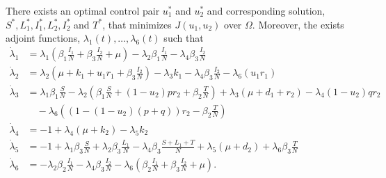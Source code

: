 \begin{theorem}
    There exists an optimal control pair $u_{1}^{*}$ and $u_{2}^{*}$ and 
    corresponding solution, $S^{*}, L_{1}^{*}, I_{1}^{*}, L_{2}^{*}, I_{2}^{*}$
    and $T^{*}$, that minimizes $J(u_1,u_2)$ over $\Omega$. Moreover, the exists
    adjoint functions, $\lambda_{1}(t), \ldots, \lambda_{6}(t)$ such that
    \begin{align*}
	    \dot{\lambda}_1	&= 
	        \lambda_{1} \left(\beta_{1}\frac{I_1}{N} + \beta_{3}\frac{I_2}{N} 
	            + \mu \right)
	       -\lambda_{2} \beta_{1}\frac{I_1}{N}
	       -\lambda_{4} \beta_{3}\frac{I_2}{N}
        \\
        \dot{\lambda}_2	&= 
	        \lambda_{2} \left( \mu + k_1 + u_1 r_1 + \beta_{3}\frac{I_2}{N}         \right)
	       -\lambda_{3} k_1
	       -\lambda_{4} \beta_{3}\frac{I_2}{N}
	       -\lambda_{6} \left( u_1 r_1 \right)
        \\
        \dot{\lambda}_3	&= 
	        \lambda_{1} \beta_{1}\frac{S}{N}
	       -\lambda_{2} \left( \beta_{1}\frac{S}{N} + (1 - u_2)pr_2 +
	            \beta_{2}\frac{T}{N} \right)
	       +\lambda_{3} \left( \mu + d_1 + r_2 \right)
	       -\lambda_{4} \left(1 - u_2\right)qr_2  \\
	       &\quad -\lambda_{6} \left((1 - ( 1- u_2)(p+q))r_2 - \beta_{2}\frac{T}{N}
	            \right)
	   \\
	   \dot{\lambda}_4	&= -1
	       +\lambda_{4} \left( \mu + k_2 \right)
	       -\lambda_{5} k_2
        \\
        \dot{\lambda}_5	&= -1
	       +\lambda_{1} \beta_{3}\frac{S}{N} 
	       +\lambda_{2} \beta_{3}\frac{L_1}{N}
	       -\lambda_{4} \beta_{3}\frac{S + L_1 + T}{N}
	       +\lambda_{5} \left( \mu + d_2 \right)
	       +\lambda_{6} \beta_{3}\frac{T}{N}
        \\
        \dot{\lambda}_6	&= 
	       -\lambda_{2} \beta_{2}\frac{I_1}{N}
	       -\lambda_{4} \beta_{3}\frac{I_2}{N}
	       -\lambda_{6} \left( \beta_{2}\frac{I_1}{N} + \beta_{3}\frac{I_2}{N}
	            + \mu \right).
    \end{align*}
\end{theorem}










